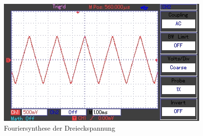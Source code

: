 	\begin{figure}[h]
		\begin{center}
		\includegraphics[scale=1.0]{picfsd.jpg}
		\caption{Fouriersynthese der Dreieckspannung}
		\label{picfsd}
		\end{center}	
	\end{figure}